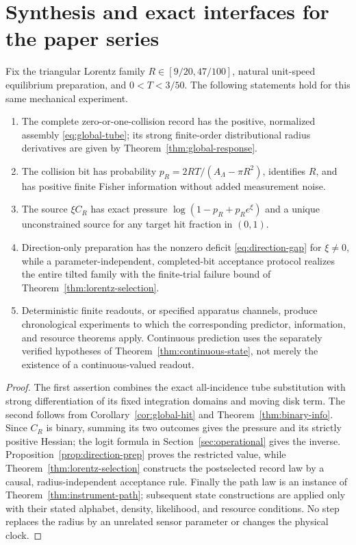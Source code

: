\section{Synthesis and exact interfaces for the paper series}\label{sec:synthesis}
\begin{theorem}\label{thm:synthesis}
Fix the triangular Lorentz family $R\in[9/20,47/100]$, natural unit-speed equilibrium preparation, and $0<T<3/50$. The following statements hold for this same mechanical experiment.
\begin{enumerate}
\item The complete zero-or-one-collision record has the positive, normalized assembly \eqref{eq:global-tube}; its strong finite-order distributional radius derivatives are given by Theorem~\ref{thm:global-response}.
\item The collision bit has probability $p_R=2RT/(A_\Lambda-\pi R^2)$, identifies $R$, and has positive finite Fisher information without added measurement noise.
\item The source $\xi C_R$ has exact pressure $\log(1-p_R+p_Re^\xi)$ and a unique unconstrained source for any target hit fraction in $(0,1)$.
\item Direction-only preparation has the nonzero deficit \eqref{eq:direction-gap} for $\xi\ne0$, while a parameter-independent, completed-bit acceptance protocol realizes the entire tilted family with the finite-trial failure bound of Theorem~\ref{thm:lorentz-selection}.
\item Deterministic finite readouts, or specified apparatus channels, produce chronological experiments to which the corresponding predictor, information, and resource theorems apply. Continuous prediction uses the separately verified hypotheses of Theorem~\ref{thm:continuous-state}, not merely the existence of a continuous-valued readout.
\end{enumerate}
\end{theorem}
\begin{proof}
The first assertion combines the exact all-incidence tube substitution with strong differentiation of its fixed integration domains and moving disk term. The second follows from Corollary~\ref{cor:global-hit} and Theorem~\ref{thm:binary-info}. Since $C_R$ is binary, summing its two outcomes gives the pressure and its strictly positive Hessian; the logit formula in Section~\ref{sec:operational} gives the inverse. Proposition~\ref{prop:direction-prep} proves the restricted value, while Theorem~\ref{thm:lorentz-selection} constructs the postselected record law by a causal, radius-independent acceptance rule. Finally the path law is an instance of Theorem~\ref{thm:instrument-path}; subsequent state constructions are applied only with their stated alphabet, density, likelihood, and resource conditions. No step replaces the radius by an unrelated sensor parameter or changes the physical clock.
\end{proof}

